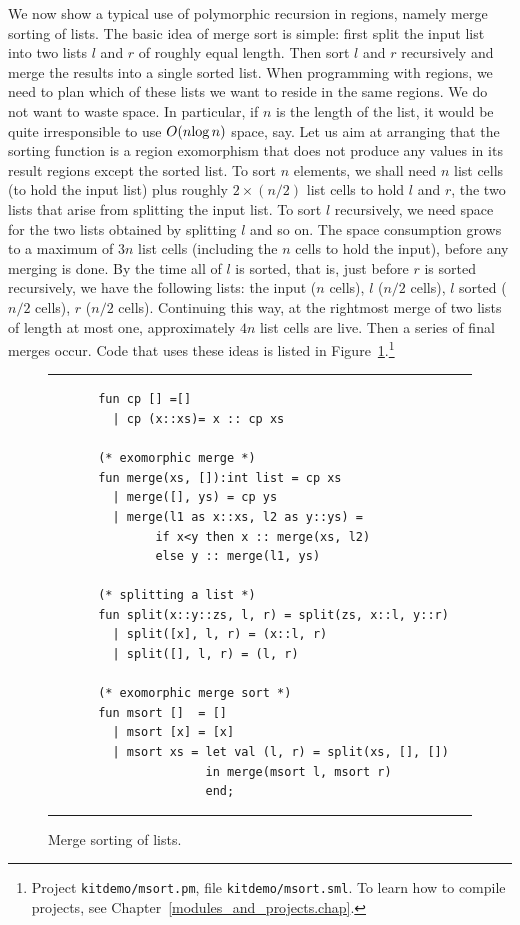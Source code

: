 \documentclass[12pt]{book}
\begin{document}
We now show a typical use of polymorphic recursion in regions, namely
merge sorting of lists. The basic idea of merge sort is simple: first
split the input list into two lists $l$ and $r$ of roughly equal
length.  Then sort $l$ and $r$ recursively and merge the results into
a single sorted list.  When programming with regions, we need to plan
which of these lists we want to reside in the same regions. We do not
want to waste space. In particular, if $n$ is the length of the list,
it would be quite irresponsible to use $O(n\hbox{log}\,n)$ space, say.
Let us aim at arranging that the sorting function is a region
exomorphism that does not produce any values in its result regions
except the sorted list. To sort $n$ elements, we shall need $n$ list
cells (to hold the input list) plus roughly $2\times(n/2)$ list cells
to hold $l$ and $r$, the two lists that arise from splitting the input
list. To sort $l$ recursively, we need space for the two lists
obtained by splitting $l$ and so on. The space consumption grows to a
maximum of $3n$ list cells (including the $n$ cells to hold the
input), before any merging is done.  By the time all of $l$ is sorted,
that is, just before $r$ is sorted recursively, we have the following
lists: the input ($n$ cells), $l$ ($n/2$ cells), $l$ sorted ($n/2$
cells), $r$ ($n/2$ cells). Continuing this way, at the rightmost merge
of two lists of length at most one, approximately $4n$ list cells are
live.  Then a series of final merges occur.  Code that uses these
ideas is listed in Figure~\ref{msort.fig}.\footnote{Project
  {\tt kitdemo/msort.pm}, file {\tt kitdemo/msort.sml}. To learn how
  to compile projects, see Chapter~\ref{modules_and_projects.chap}.}
\begin{figure}[t]
\hrule\medskip
\begin{verbatim}
       fun cp [] =[]
         | cp (x::xs)= x :: cp xs

       (* exomorphic merge *)
       fun merge(xs, []):int list = cp xs
         | merge([], ys) = cp ys
         | merge(l1 as x::xs, l2 as y::ys) = 
               if x<y then x :: merge(xs, l2) 
               else y :: merge(l1, ys)

       (* splitting a list *)
       fun split(x::y::zs, l, r) = split(zs, x::l, y::r)
         | split([x], l, r) = (x::l, r)
         | split([], l, r) = (l, r)

       (* exomorphic merge sort *)
       fun msort []  = []
         | msort [x] = [x]
         | msort xs = let val (l, r) = split(xs, [], [])
                      in merge(msort l, msort r)
                      end;
\end{verbatim}
\caption{Merge sorting of lists.}
\label{msort.fig}
\medskip\hrule
\end{figure}
\end{document}
